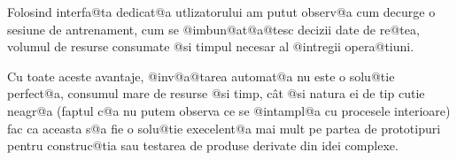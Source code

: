 Folosind interfa@ta dedicat@a utlizatorului am putut observ@a cum decurge o sesiune de antrenament, cum se @imbun@at@a@tesc decizii date de re@tea, volumul de resurse consumate @si timpul necesar al @intregii opera@tiuni.

Cu toate aceste avantaje, @inv@a@tarea automat@a nu este o solu@tie perfect@a, consumul mare de resurse @si timp, c\^ at @si natura ei de tip cutie neagr@a (faptul c@a nu putem observa ce se @intampl@a cu procesele interioare) fac ca aceasta s@a fie o solu@tie execelent@a mai mult pe partea de prototipuri pentru construc@tia sau testarea de produse derivate din idei complexe. 
